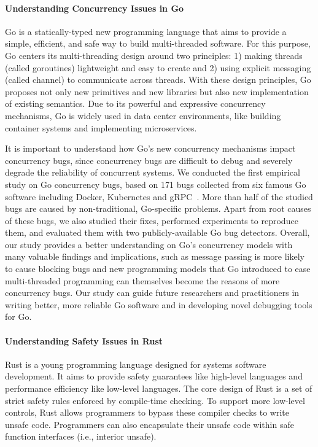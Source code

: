 \documentclass[10pt]{article}
\begin{document}
\vspace{-.1in}
\paragraph{Understanding Concurrency Issues in Go}
Go is a statically-typed new programming language that aims to provide 
a simple, efficient, and safe way to build multi-threaded software.
For this purpose, Go centers its multi-threading design 
around two principles: 1) making threads (called goroutines) lightweight 
and easy to create and 2) using explicit messaging (called channel) 
to communicate across threads. With these design principles, 
Go proposes not only new primitives and new libraries 
but also new implementation of existing semantics.
Due to its powerful and expressive concurrency mechanisms, 
Go is widely used in data center environments,
like building container systems and implementing microservices.

It is important to understand how Go's new concurrency mechanisms impact concurrency bugs, 
since concurrency bugs are difficult to debug and severely degrade 
the reliability of concurrent systems. 
We conducted the first empirical study on Go concurrency bugs, based on 171 bugs collected from  
six famous Go software 
including Docker, Kubernetes and gRPC~\cite{go-asplos}.
More than half of the studied bugs are caused by non-traditional, Go-specific problems. 
Apart from root causes of these bugs, we also studied their fixes, 
performed experiments to reproduce them, 
and evaluated them with two publicly-available Go bug detectors.
Overall, our study provides a better understanding on Go's concurrency models
with many valuable findings and implications, such as message passing is more likely to 
cause blocking bugs and new programming models
that Go introduced to ease multi-threaded programming can themselves 
become the reasons of more concurrency bugs. 
Our study can guide future researchers and practitioners in writing better, 
more reliable Go software and in developing novel debugging tools for Go.

\vspace{-.1in}
\paragraph{Understanding Safety Issues in Rust}
Rust is a young programming language designed for systems software development. 
It aims to provide safety guarantees like high-level languages 
and performance efficiency
like low-level languages. The core design of Rust is a set
of strict safety rules enforced by compile-time checking. To
support more low-level controls, Rust allows programmers
to bypass these compiler checks to write unsafe code. 
Programmers can also encapsulate their unsafe code within safe
function interfaces (i.e., interior unsafe).
\end{document}
